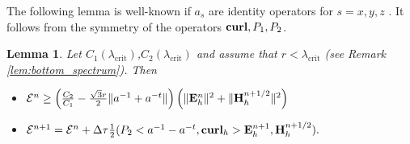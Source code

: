 \documentclass[12pt,reqno]{amsart}
\newcommand{\curl}{{\bf curl}}
\newcommand{\e}{{\bf E}}
\newcommand{\h}{{\bf H}}
\newtheorem{lem}[theorem]{Lemma}
\theoremstyle{definition}
\numberwithin{equation}{section}
\begin{document}
The following lemma is well-known if $a_s$ are identity operators for $s=x,y,z$ \cite[Theorem 4.1]{sakka}. It follows  from the symmetry of the operators $\curl,P_1,P_2$. 
\begin{lem}
	Let $C_1(\lambda_{\mathrm{crit}})$,$C_2(\lambda_{\mathrm{crit}})$ and assume that  $r<\lambda_{\mathrm{crit}}$  (see Remark \ref{lem:bottom_spectrum}).
	Then
	\begin{itemize}
		\item $\mathcal{E}^{n}\geq 
		\left(
		\frac{C_2}{C_1}-\frac{\sqrt{3}r}{2}\|
		a^{-1}+a^{-t}\|
		\right)
		\left (\|\e^{n}_h\|^2+\|\h^{n+1/2}_h\|^2 \right)$
		\item 	$
		{\mathcal E}^{n+1}=	{\mathcal E}^{n}+
	\Delta \tau\frac{1}{2}(P_2<a^{-1}-a^{-t},\curl_h>\e_h^{n+1},\h_h^{n+1/2}).
	$
		\end{itemize}
\end{lem}
\end{document}
